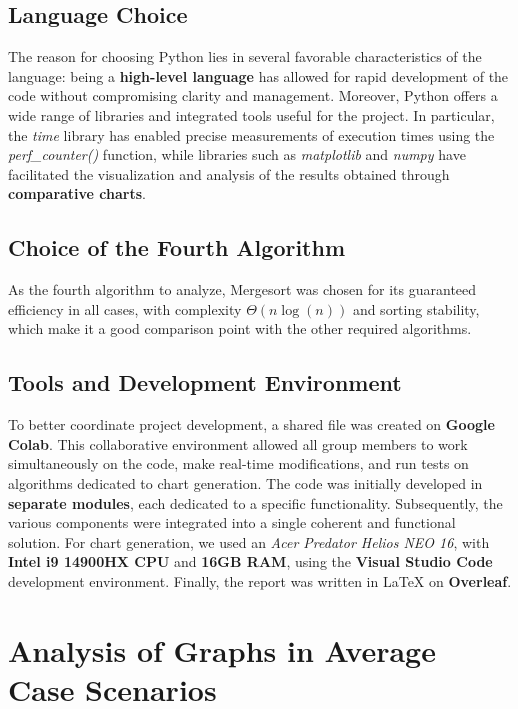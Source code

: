 \documentclass{article}
\begin{document}
\subsection*{Language Choice}
The reason for choosing Python lies in several favorable characteristics of the language: being a \textbf{high-level language} has allowed for rapid development of the code without compromising clarity and management.
Moreover, Python offers a wide range of libraries and integrated tools useful for the project. In particular, the \emph{time} library has enabled precise measurements of execution times using the \emph{perf\_counter()} function, while libraries such as \emph{matplotlib} and \emph{numpy} have facilitated the visualization and analysis of the results obtained through \textbf{comparative charts}.

\subsection*{Choice of the Fourth Algorithm}
As the fourth algorithm to analyze, Mergesort was chosen for its guaranteed efficiency in all cases, with complexity $\Theta(n \log (n))$ and sorting stability, which make it a good comparison point with the other required algorithms.

\subsection*{Tools and Development Environment}
To better coordinate project development, a shared file was created on \textbf{Google Colab}. This collaborative environment allowed all group members to work simultaneously on the code, make real-time modifications, and run tests on algorithms dedicated to chart generation.
The code was initially developed in \textbf{separate modules}, each dedicated to a specific functionality. Subsequently, the various components were integrated into a single coherent and functional solution.
For chart generation, we used an \emph{Acer Predator Helios NEO 16}, with \textbf{Intel i9 14900HX CPU} and \textbf{16GB RAM}, using the \textbf{Visual Studio Code} development environment.
Finally, the report was written in LaTeX on \textbf{Overleaf}.

\section{Analysis of Graphs in Average Case Scenarios}
\label{sec:grafici}
\end{document}

